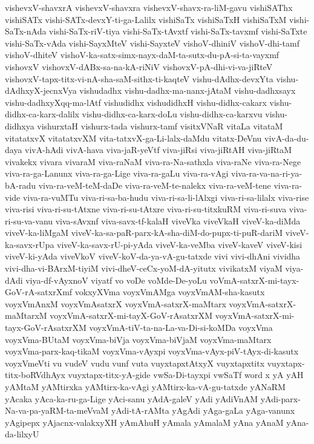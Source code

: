 {vishevxV-shavxrA
vishevxV-shavxra
vishevxV-shavx-ra-liM-gavu
vishiSAThx
vishiSATx
vishi-SATx-devxY-ti-ga-Lalilx
vishiSaTx
vishiSaTxH
vishiSaTxM
vishi-SaTx-nAda
vishi-SaTx-riV-tiya
vishi-SaTx-tAvxtf
vishi-SaTx-tavxmf
vishi-SaTxte
vishi-SaTx-vAda
vishi-SayxMteV
vishi-SayxteV
vishoV-dhiniV
vishoV-dhi-tamf
vishoV-dhiteV
vishoV-ka-satx-simx-nayx-daM-ta-sutx-du-pA-si-ta-vayxmf
vishovxV
vishovxV-dABx-sa-na-kA-riNiV
vishovxV-pA-dhi-vi-va-jiRteV
vishovxV-tapx-titx-vi-nA-sha-saM-sithx-ti-kaqteV
vishu-dAdhx-devxYta
vishu-dAdhxyX-jecnxVya
vishudadhx
vishu-dadhx-ma-nanx-jAtaM
vishu-dadhxsayx
vishu-dadhxyXqq-ma-lAtf
vishudidhx
vishudidhxH
vishu-didhx-cakarx
vishu-didhx-ca-karx-dalilx
vishu-didhx-ca-karx-doLu
vishu-didhx-ca-karxvu
vishu-didhxya
vishurxtaH
vishurx-tada
vishurx-tamf
visitxVNaR
vitaLa
vitataM
vitatatxvX
vitatatxvXM
vita-tatxvX-ga-Li-lalx-daMdu
vitatx-DeVnu
vivA-da-du-daya
vivA-hAdi
vivA-hava
viva-jaR-yeVtf
viva-jiRsi
viva-jiRtAH
viva-jiRtaM
vivakekx
vivara
vivaraM
viva-raNaM
viva-ra-Na-sathxla
viva-raNe
viva-ra-Nege
viva-ra-ga-Lanunx
viva-ra-ga-Lige
viva-ra-gaLu
viva-ra-vAgi
viva-ra-va-na-ri-ya-bA-radu
viva-ra-veM-teM-daDe
viva-ra-veM-te-nalekx
viva-ra-veM-tene
viva-ra-vide
viva-ra-vuMTu
viva-ri-sa-ba-hudu
viva-ri-sa-li-lAlxgi
viva-ri-sa-lilalx
viva-rise
viva-risi
viva-ri-su-tAtxne
viva-ri-su-tAtxre
viva-ri-su-titxkuRM
viva-ri-suva
viva-ri-su-va-vanu
viva-sAvxnf
viva-savx-tf-kalaH
viveVka
viveVkaH
viveV-ka-diMda
viveV-ka-liMgaM
viveV-ka-sa-paR-parx-kA-sha-diM-do-pupx-ti-puR-dariM
viveV-ka-savx-rUpa
viveV-ka-savx-rU-pi-yAda
viveV-ka-veMba
viveV-kaveV
viveV-kisi
viveV-ki-yAda
viveVkoV
viveV-koV-da-ya-vA-gu-tatxde
vivi
vivi-dhAni
vividha
vivi-dha-vi-BArxM-tiyiM
vivi-dheV-ceCx-yoM-dA-yitutx
vivikatxM
viyaM
viya-dAdi
viya-df-vAyxnoV
viyatf
vo
voDe
voMde-De-yoLu
voVmA-satxrX-mi-tayx-GoV-rA-satxrXmf
vokxyXVma
voyxVmAMga
voyxVmAM-sha-kasutx
voyxVmAnxM
voyxVmAsatxrX
voyxVmA-satxrX-maMtarx
voyxVmA-satxrX-maMtarxM
voyxVmA-satxrX-mi-tayX-GoV-rAsatxrXM
voyxVmA-satxrX-mi-tayx-GoV-rAsatxrXM
voyxVmA-tiV-ta-na-La-va-Di-si-koMDa
voyxVma
voyxVma-BUtaM
voyxVma-biVja
voyxVma-biVjaM
voyxVma-maMtarx
voyxVma-parx-kaq-tikaM
voyxVma-vAyxpi
voyxVma-vAyx-piV-tAyx-di-kasutx
voyxVmeVti
vu
vudeV
vudu
vunf
vuta
vuyxtapxtAtxyX
vuyxtapxtitx
vuyxtapx-titx-boRVdhAyx
vuyxtapx-titx-yA-gide
vwSa-Di-tayxpi
vwSaTf
word
x
yA
yAH
yAMtaM
yAMtirxka
yAMtirx-ka-vAgi
yAMtirx-ka-vA-gu-tatxde
yANaRM
yAcaka
yAca-ka-ru-ga-Lige
yAci-sanu
yAdA-galeV
yAdi
yAdiVnAM
yAdi-parx-Na-va-pa-yaRM-ta-meVvaM
yAdi-tA-rAMta
yAgAdi
yAga-gaLa
yAga-vanunx
yAgipepx
yAjacnx-valakxyXH
yAmAhuH
yAmala
yAmalaM
yAna
yAnaM
yAna-da-lilxyU
}
